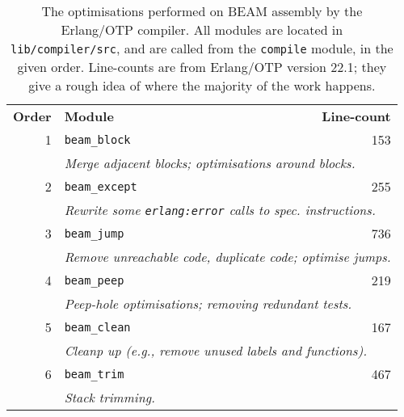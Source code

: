 \begin{table}[ht!]
\centering
\def\arraystretch{1.2}
\begin{tabular}{rlr}
\textbf{Order} & \textbf{Module} & \textbf{Line-count} \\\cline{2-3}
1 & \texttt{beam\_block} & 153 \\
  & \multicolumn{2}{l}{\quad\emph{%
      Merge adjacent blocks; optimisations around blocks.%
    }} \\\cline{2-3}
2 & \texttt{beam\_except} & 255 \\
  & \multicolumn{2}{l}{\quad\emph{%
      Rewrite some \texttt{erlang:error} calls to spec. instructions.%
    }} \\\cline{2-3}
3 & \texttt{beam\_jump} & 736 \\
  & \multicolumn{2}{l}{\quad\emph{%
      Remove unreachable code, duplicate code; optimise jumps.%
    }} \\\cline{2-3}
4 & \texttt{beam\_peep} & 219 \\
  & \multicolumn{2}{l}{\quad\emph{%
      Peep-hole optimisations; removing redundant tests.%
    }} \\\cline{2-3}
5 & \texttt{beam\_clean} & 167 \\
  & \multicolumn{2}{l}{\quad\emph{%
      Cleanp up (e.g., remove unused labels and functions).%
    }} \\\cline{2-3}
6 & \texttt{beam\_trim} & 467 \\
  & \multicolumn{2}{l}{\quad\emph{%
      Stack trimming.
    }} \\\cline{2-3}
\end{tabular}
\caption{The optimisations performed on BEAM assembly by the
Erlang/OTP compiler. All modules are located in
\texttt{lib/compiler/src}, and are called from the \texttt{compile}
module, in the given order.  Line-counts are from Erlang/OTP version
22.1; they give  a rough idea of where the majority of the work
happens.}
\label{tbl:asm-optimisations}
\end{table}
